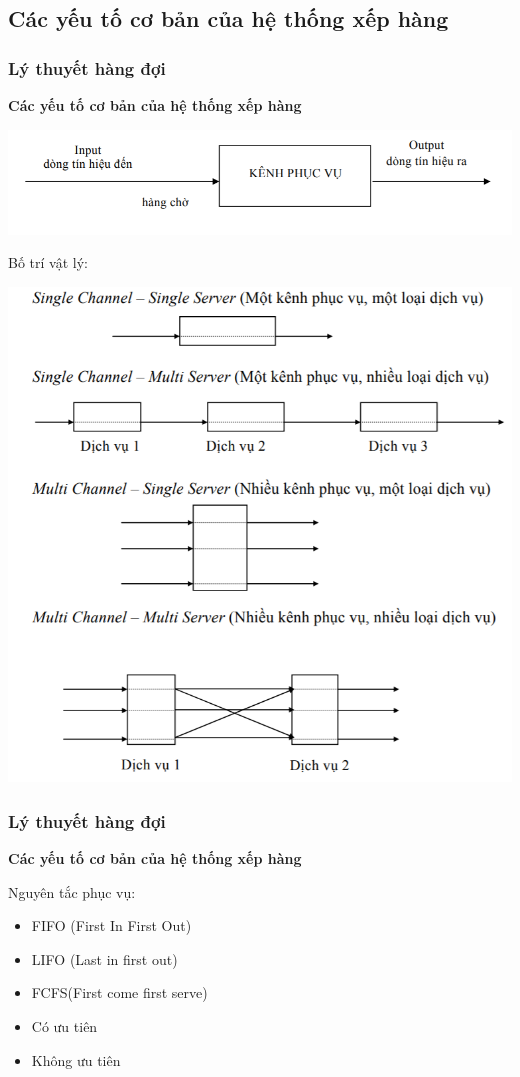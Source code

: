 \documentclass[10pt]{beamer}
\begin{document}
\subsection{Các yếu tố cơ bản của hệ thống xếp hàng}
\begin{frame}
\frametitle{Lý thuyết hàng đợi}
\begin{block}{\textbf{Các yếu tố cơ bản của hệ thống xếp hàng}}
\begin{center}
    \includegraphics[scale=.5]{img/HeThongHangCho.PNG}
\end{center}
Bố trí vật lý:
\begin{center}
    \includegraphics[scale=.5]{img/CacDangHTHangCho.PNG}
\end{center}
\end{block}
\end{frame}
\begin{frame}
\frametitle{Lý thuyết hàng đợi}
\begin{block}{\textbf{Các yếu tố cơ bản của hệ thống xếp hàng}}
\par Nguyên tắc phục vụ:
\begin{itemize}
    \item FIFO (First In First Out)
    \item LIFO (Last in first out)
    \item FCFS(First come first serve)
    \item Có ưu tiên
    \item Không ưu tiên
\end{itemize}
\end{block}
\end{frame}
\end{document}
